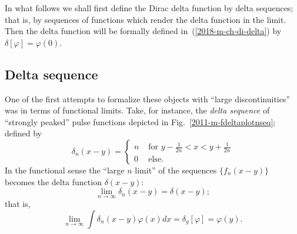In what follows we shall first define the Dirac delta function by delta sequences; that is, by sequences of functions which render the
delta function in the limit.
Then the delta function will be formally defined in~(\ref{2018-m-ch-di-delta}) by $\delta [\varphi ]=\varphi (0)$.

\subsection{Delta sequence}
One of the first attempts to formalize these objects with ``large discontinuities''
was in terms
of functional limits.
Take, for instance, the {\em delta sequence}
of ``strongly peaked'' pulse functions
depicted in Fig.~\ref{2011-m-fdeltaplotnseq};
defined by
\begin{equation}
\delta_n(x-y) =
\left\{
\begin{array}{rl}
n & \textrm{ for } y - \frac{1}{2n}  < x < y+ \frac{1}{2n} \\
0& \textrm{ else. }
\end{array}
\right.
\label{2011-m-deltseq}
\end{equation}
In  the functional sense the ``large $n$ limit''   of
the sequences $\{f_n(x-y)\}$
 becomes the delta function $\delta (x-y)$:
\begin{equation}
\lim_{n\rightarrow \infty} \delta_n(x-y)= \delta (x-y) ;
\end{equation}
that is,
\begin{equation}
\lim_{n\rightarrow \infty} \int \delta_n(x-y) \varphi (x) dx = \delta_y [\varphi ]=\varphi (y).
\end{equation}

